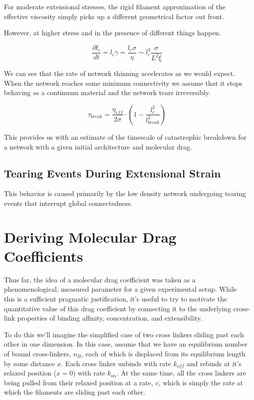 \documentclass[pre,preprint]{revtex4-1}
\begin{document}
For moderate extensional stresses, the rigid filament approximation of the effective viscosity simply picks up a different geometrical factor out front.  

However, at higher stress and in the presence of different things happen.

\begin{equation}
\frac{\partial l_c}{dt}=l_c\dot \gamma =\frac{l_c \sigma}{\eta}\sim l_c^3\frac{ \sigma}{L^2 \xi}
\end{equation}

We can see that the rate of network thinning accelerates as we would expect.  When the network reaches some minimum connectivity we assume that it stops behaving as a continuum material and the network tears irreversibly.  

\begin{equation}
\tau_{break} = \frac{\eta_{eff}}{2\sigma}\cdot\left ( 1 -\frac{l_c^2}{l_{break}^2} \right )
\end{equation}

This provides us with an estimate of the timescale of catastrophic breakdown for a network with a given initial architecture and molecular drag.


\subsection{Tearing Events During Extensional Strain}

This behavior is caused primarily by the low density network undergoing tearing events that interrupt global connectedness.  





\section{Deriving Molecular Drag Coefficients}
\label{app:drag}
Thus far, the idea of a molecular drag coefficient was taken as a phenomenological, measured parameter for a given experimental setup.  While this is a sufficient pragmatic justification, it's useful to try to motivate the quantitative value of this drag coefficient by connecting it to the underlying cross-link properties of binding affinity, concentration, and extensibility.

To do this we'll imagine the simplified case of two cross linkers sliding past each other in one dimension.  In this case, assume that we have an equilibrium number of bound cross-linkers, $n_B$, each of which is displaced from its equilibrium length by some distance $x$.  Each cross linker unbinds with rate $k_{off}$ and rebinds at it's relaxed position ($x=0$) with rate $k_{on}$.  At the same time, all the cross linkers are being pulled from their relaxed position at a rate, $v$, which is simply the rate at which the filaments are sliding past each other.  
\end{document}

